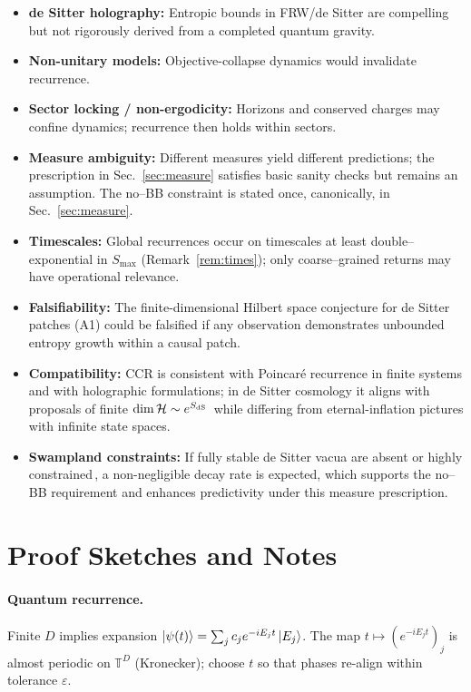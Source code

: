 \documentclass[12pt]{article}
\newcommand{\Smax}{S_{\max}}
\theoremstyle{remark}
\begin{document}
\begin{itemize}
    \item \textbf{de Sitter holography:} Entropic bounds in FRW/de Sitter are compelling but not rigorously derived from a completed quantum gravity.
    \item \textbf{Non-unitary models:} Objective-collapse dynamics would invalidate recurrence.
    \item \textbf{Sector locking / non-ergodicity:} Horizons and conserved charges may confine dynamics; recurrence then holds within sectors.
    \item \textbf{Measure ambiguity:} Different measures yield different predictions; the prescription in Sec.~\ref{sec:measure} satisfies basic sanity checks but remains an assumption. The no--BB constraint is stated once, canonically, in Sec.~\ref{sec:measure}.
    \item \textbf{Timescales:} Global recurrences occur on timescales at least double--exponential in $\Smax$ (Remark~\ref{rem:times}); only coarse--grained returns may have operational relevance.
    \item \textbf{Falsifiability:} The finite-dimensional Hilbert space conjecture for de Sitter patches (A1) could be falsified if any observation demonstrates unbounded entropy growth within a causal patch.
    \item \textbf{Compatibility:} CCR is consistent with Poincar\'e recurrence in finite systems and with holographic formulations; in de Sitter cosmology it aligns with proposals of finite $\dim\mathcal H\sim e^{S_{\rm dS}}$\,\cite{BanksFischler2001,BanksFischler2003} while differing from eternal-inflation pictures with infinite state spaces.
    \item \textbf{Swampland constraints:} If fully stable de Sitter vacua are absent or highly constrained\,\cite{Obied2018,Ooguri2019}, a non-negligible decay rate is expected, which supports the no--BB requirement and enhances predictivity under this measure prescription.
\end{itemize}


\section{Proof Sketches and Notes}
\paragraph{Quantum recurrence.} Finite $D$ implies expansion $|\psi(t)\rangle=\sum_j c_j e^{-iE_j t}\ket{E_j}$. The map $t\mapsto (e^{-iE_j t})_j$ is almost periodic on $\mathbb{T}^D$ (Kronecker); choose $t$ so that phases re-align within tolerance $\varepsilon$.
\end{document}
